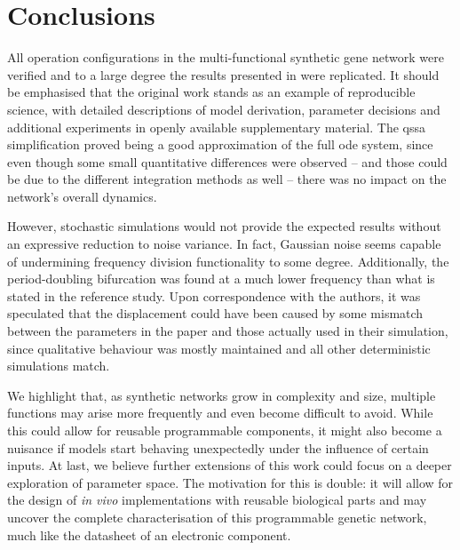 \section{Conclusions}

  All operation configurations in the multi-functional synthetic gene network were verified and to a large degree the results presented in \cite{multif} were replicated.
  It should be emphasised that the original work stands as an example of reproducible science, with detailed descriptions of model derivation, parameter decisions and additional experiments in openly available supplementary material.
  The \ac{qssa} simplification proved being a good approximation of the full \ac{ode} system, since even though some small quantitative differences were observed -- and those could be due to the different integration methods as well -- there was no impact on the network's overall dynamics.

  However, stochastic simulations would not provide the expected results without an expressive reduction to noise variance.
  In fact, Gaussian noise seems capable of undermining frequency division functionality to some degree.
  Additionally, the period-doubling bifurcation was found at a much lower frequency than what is stated in the reference study.
  Upon correspondence with the authors, it was speculated that the displacement could have been caused by some mismatch between the parameters in the paper and those actually used in their simulation, since qualitative behaviour was mostly maintained and all other deterministic simulations match.

  We highlight that, as synthetic networks grow in complexity and size, multiple functions may arise more frequently and even become difficult to avoid.
  While this could allow for reusable programmable components, it might also become a nuisance if models start behaving unexpectedly under the influence of certain inputs.
  At last, we believe further extensions of this work could focus on a deeper exploration of parameter space.
  The motivation for this is double: it will allow for the design of \textit{in vivo} implementations with reusable biological parts and may uncover the complete characterisation of this programmable genetic network, much like the datasheet of an electronic component.
